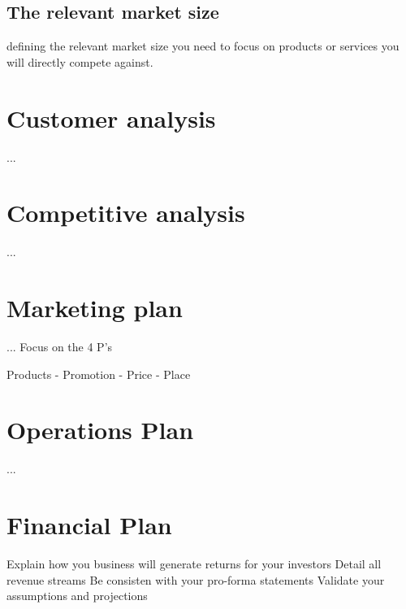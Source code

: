 \documentclass{article}
\begin{document}
\subsection{The relevant market size}
defining the relevant market size you need to focus on products or services you will directly compete against.


\section{Customer analysis}
...

\section{Competitive analysis}
...

\section{Marketing plan}
...
Focus on the 4 P's

Products - Promotion - Price - Place

\section{Operations Plan}
...

\section{Financial Plan}
Explain how you business will generate returns for your investors
Detail all revenue streams
Be consisten with your pro-forma statements
Validate your assumptions and projections
\end{document}
